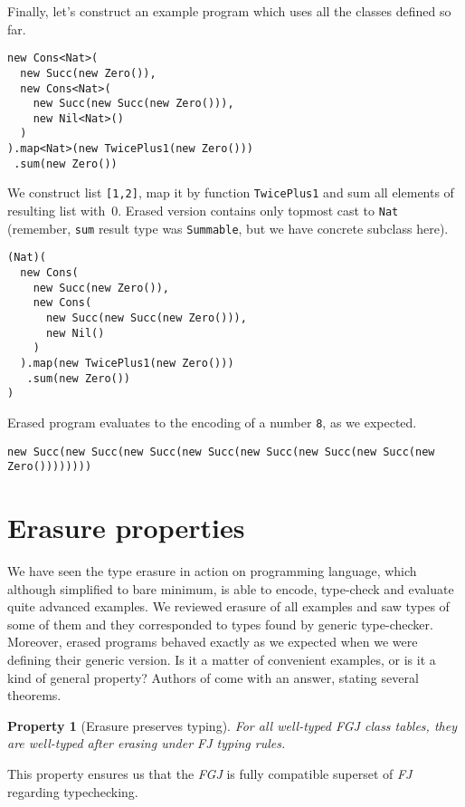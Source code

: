 \documentclass{article}[12pt]
\begin{document}
Finally, let's construct an example program which uses all the classes
defined so far.

\begin{verbatim}
new Cons<Nat>(
  new Succ(new Zero()),
  new Cons<Nat>(
    new Succ(new Succ(new Zero())),
    new Nil<Nat>()
  )
).map<Nat>(new TwicePlus1(new Zero()))
 .sum(new Zero())
\end{verbatim}

We construct list \texttt{[1,2]}, map it by function
\texttt{TwicePlus1} and sum all elements of resulting list
with~0. Erased version contains only topmost cast to \texttt{Nat}
(remember, \texttt{sum} result type was \texttt{Summable},
but we have concrete subclass here).

\begin{verbatim}
(Nat)(
  new Cons(
    new Succ(new Zero()),
    new Cons(
      new Succ(new Succ(new Zero())),
      new Nil()
    )
  ).map(new TwicePlus1(new Zero()))
   .sum(new Zero())
)
\end{verbatim}

Erased program evaluates to the encoding of a number \texttt{8},
as we expected.

\begin{verbatim}
new Succ(new Succ(new Succ(new Succ(new Succ(new Succ(new Succ(new Zero())))))))
\end{verbatim}


\section{Erasure properties}

We have seen the type erasure in action on programming language,
which although simplified to bare minimum, is able to encode,
type-check and evaluate quite advanced examples. We reviewed
erasure of all examples and saw types of some of them and
they corresponded to types found by generic type-checker. Moreover,
erased programs behaved exactly as we expected when we were
defining their generic version. Is it a matter of convenient
examples, or is it a kind of general property?
Authors of \cite{fj} come with an answer, stating several theorems.

\newtheorem{theorem}{Property}
\begin{theorem}[Erasure preserves typing]
For all well-typed \emph{FGJ} class tables, they are well-typed
after erasing under \emph{FJ} typing rules.
\end{theorem}
This property ensures us that the \emph{FGJ} is fully compatible
superset of \emph{FJ} regarding typechecking.
\end{document}
